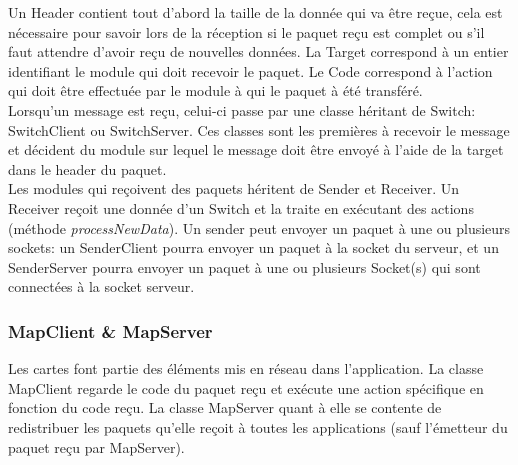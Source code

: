 Un Header contient tout d'abord la taille de la donnée qui va être reçue, cela est nécessaire pour savoir lors de la réception si le paquet reçu est complet ou s'il faut attendre d'avoir reçu de nouvelles données. La Target correspond à un entier identifiant le module qui doit recevoir le paquet. Le Code correspond à l'action qui doit être effectuée par le module à qui le paquet à été transféré.\\

Lorsqu'un message est reçu, celui-ci passe par une classe héritant de Switch: SwitchClient ou SwitchServer. Ces classes sont les premières à recevoir le message et décident du module sur lequel le message doit être envoyé à l'aide de la target dans le header du paquet.\\

Les modules qui reçoivent des paquets héritent de Sender et Receiver. Un Receiver reçoit une donnée d'un Switch et la traite en exécutant des actions (méthode \emph{processNewData}). Un sender peut envoyer un paquet à une ou plusieurs sockets: un SenderClient pourra envoyer un paquet à la socket du serveur, et un SenderServer pourra envoyer un paquet à une ou plusieurs Socket(s) qui sont connectées à la socket serveur.\\

\subsubsection{MapClient \& MapServer}
Les cartes font partie des éléments mis en réseau dans l'application. La classe MapClient regarde le code du paquet reçu et exécute une action spécifique en fonction du code reçu. La classe MapServer quant à elle se contente de redistribuer les paquets qu'elle reçoit à toutes les applications (sauf l'émetteur du paquet reçu par MapServer).\\

